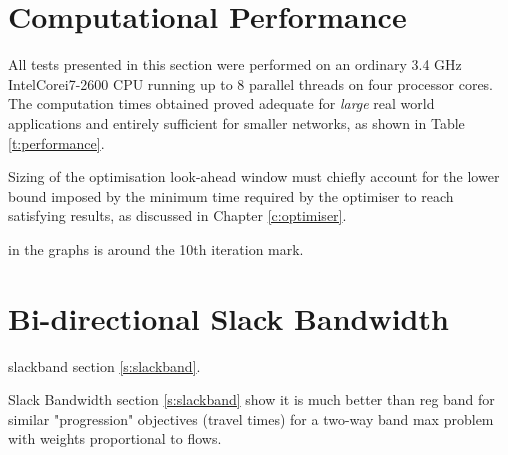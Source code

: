 \section{Computational Performance} \label{res:performance}
All tests presented in this section were performed on an ordinary 3.4 GHz Intel\textregistered Core\texttrademark i7-2600 CPU running up to 8 parallel threads on four processor cores. The computation times obtained proved adequate for \emph{large} real world applications and entirely sufficient for smaller networks, as shown in Table \ref{t:performance}.

Sizing of the optimisation look-ahead window must chiefly account for the lower bound imposed by the minimum time required by the optimiser to reach satisfying results, as discussed in Chapter \ref{c:optimiser}.

in the graphs is around the 10th iteration mark. 








\section{Bi-directional Slack Bandwidth}
slackband section \ref{s:slackband}.



Slack Bandwidth section \ref{s:slackband} show it is much better than reg band for similar "progression" objectives (travel times) for a two-way band max problem with weights proportional to flows. 

